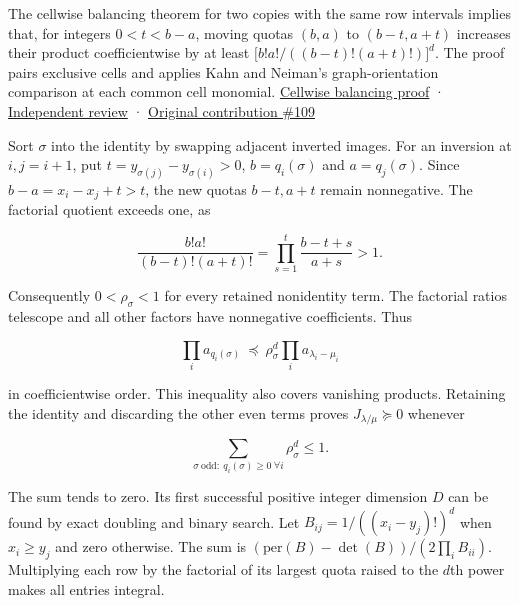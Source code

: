 \documentclass[11pt]{article}
\begin{document}
The cellwise balancing theorem for two copies with the same row intervals implies that, for integers $0<t<b-a$, moving quotas $(b,a)$ to $(b-t,a+t)$ increases their product coefficientwise by at least $\big[b!a!/((b-t)!(a+t)!)\big]^d$. The proof pairs exclusive cells and applies Kahn and Neiman's graph-orientation comparison at each common cell monomial. \href{https://github.com/ProgramComputer/open-math-research/blob/df69845d684709dfc8a6bc21f08eb7e4c49d8727/topics/balanced-arrays/quota-minors/cellwise-balancing.md}{Cellwise balancing proof} · \href{https://github.com/ProgramComputer/open-math-research/blob/df69845d684709dfc8a6bc21f08eb7e4c49d8727/topics/balanced-arrays/quota-minors/regular-toeplitz-order-two-review.md}{Independent review} · \href{https://github.com/ProgramComputer/open-math-research/pull/109}{Original contribution \#109}

Sort $\sigma$ into the identity by swapping adjacent inverted images. For an inversion at $i,j=i+1$, put $t=y_{\sigma(j)}-y_{\sigma(i)}>0$, $b=q_i(\sigma)$ and $a=q_j(\sigma)$. Since $b-a=x_i-x_j+t>t$, the new quotas $b-t,a+t$ remain nonnegative. The factorial quotient exceeds one, as

\begin{equation*}
\frac{b!a!}{(b-t)!(a+t)!}=\prod_{s=1}^{t}\frac{b-t+s}{a+s}>1.
\end{equation*}

Consequently $0<\rho_\sigma<1$ for every retained nonidentity term. The factorial ratios telescope and all other factors have nonnegative coefficients. Thus

\begin{equation*}
\prod_i a_{q_i(\sigma)}\ \preceq\ \rho_\sigma^d\prod_i a_{\lambda_i-\mu_i}
\end{equation*}

in coefficientwise order. This inequality also covers vanishing products. Retaining the identity and discarding the other even terms proves $J_{\lambda/\mu}\succeq0$ whenever

\begin{equation*}
\sum_{\sigma\ \mathrm{odd}:\ q_i(\sigma)\ge0\ \forall i}\rho_\sigma^d\le1.
\end{equation*}

The sum tends to zero. Its first successful positive integer dimension $D$ can be found by exact doubling and binary search. Let $B_{ij}=1/((x_i-y_j)!)^d$ when $x_i\ge y_j$ and zero otherwise. The sum is $(\mathrm{per}(B)-\det(B))/(2\prod_i B_{ii})$. Multiplying each row by the factorial of its largest quota raised to the $d$th power makes all entries integral.
\end{document}
